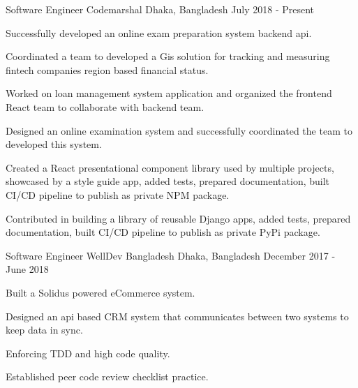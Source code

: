 \begin{cventries}

\cventry
    {Software Engineer}
    {Codemarshal}
    {Dhaka, Bangladesh}
    {July 2018 - Present}
    {
      \begin{cvitemsNumber}[Responsibilities:]
        \item {Successfully developed an online exam preparation system backend api.}
        \vspace{1mm}
        \item {Coordinated a team to developed a Gis solution for tracking and measuring fintech companies region based financial status.}
        \vspace{1mm}
        \item {Worked on loan management system application and organized the frontend React team to collaborate with backend team.}
        \vspace{1mm}
        \item {Designed an online examination system and successfully coordinated the team to developed this system.}
        \vspace{1mm}
        \item {Created a React presentational component library used by multiple
                projects, showcased by a style guide app, added tests, prepared
                documentation, built CI/CD pipeline to publish as private NPM
                package.}
        \vspace{1mm}
        \item {Contributed in building a library of reusable Django apps, added tests, prepared documentation, built CI/CD pipeline to publish as private PyPi package.}
        \vspace{1mm}
      \end{cvitemsNumber}
    }

\cventry
    {Software Engineer}
    {WellDev Bangladesh}
    {Dhaka, Bangladesh}
    {December 2017 - June 2018}
    {
      \begin{cvitemsNumber}[Responsibilities]
        \item {Built a Solidus powered eCommerce system.}
        \vspace{1mm}
        \item {Designed an api based CRM system that communicates between two systems to keep data in sync.}
        \vspace{1mm}
        \item {Enforcing TDD and high code quality.}
        \vspace{1mm}
        \item {Established peer code review checklist practice.}
        \vspace{1mm}
      \end{cvitemsNumber}
    }


\end{cventries}
